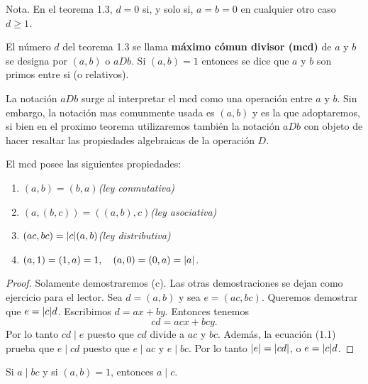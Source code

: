 \documentclass[12pt,a4paper]{book}
\begin{document}
    Nota. En el teorema 1.3, $d=0$ si, y solo si, $a=b=0$ en cualquier otro caso $d\geq1.$

    \begin{definicion}
        El número $d$ del teorema 1.3 se llama \textbf{máximo cómun divisor (mcd)} de $a$ y
        $b$ se designa por $(a,b)$ o $aDb$. Si $(a,b)=1$ entonces se dice que $a$ y $b$ son
        primos entre si (o relativos).
    \end{definicion}

    La notación $aDb$ surge al interpretar el mcd como una operación entre $a$ y $b$. Sin
    embargo, la notación mas comunmente usada es $(a,b)$ y es la que adoptaremos, si bien
    en el proximo teorema utilizaremos también la notación $aDb$ con objeto de hacer resaltar
    las propiedades algebraicas de la operación $D$.
    
    \begin{teorema}
        El mcd posee las siguientes propiedades:
        \begin{enumerate}
            \item[(a)] $(a,b)=(b,a)$\hfill\textit{(ley conmutativa)}
            \item[(b)] $(a,(b,c))=((a,b),c)$\hfill\textit{(ley asociativa)}
            \item[(c)] $(ac,bc)=\abs{c}(a,b)$\hfill\textit{(ley distributiva)}
            \item[(d)] $(a,1)=(1,a)=1,\quad (a,0)=(0,a)=\abs{a}$.   
        \end{enumerate}
    \end{teorema}

    \begin{proof}
        Solamente demostraremos (c). Las otras demostraciones se dejan como ejercicio para el
        lector. Sea $d=(a,b)$ y sea $e=(ac,bc)$. Queremos demostrar que $e=\abs{c}d$. Escribimos
        $d=ax+by$. Entonces tenemos
        \begin{equation}
            cd=acx+bcy.
        \end{equation}
        Por lo tanto $cd\mid e$ puesto que $cd$ divide a $ac$ y $bc$. Además, la ecuación (1.1)
        prueba que $e\mid cd$ puesto que $e\mid ac$ y $e\mid bc$. Por lo tanto $\abs{e}=\abs{cd}$,
        o $e=\abs{c}d$.
    \end{proof}

    \begin{teorema}
        Si $a\mid bc$ y si $(a,b)=1$, entonces $a\mid c$.
    \end{teorema}
\end{document}

